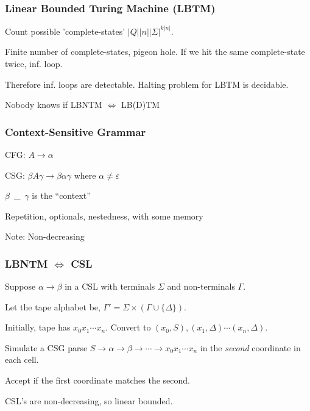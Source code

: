 \documentclass[languages_and_machines.tex]{subfiles}
\begin{document}
\begin{frame}
  \frametitle{Linear Bounded Turing Machine (LBTM)}

  Count possible 'complete-states' \(\lvert Q \rvert \lvert n \rvert \lvert \Sigma \rvert^{k \lvert n \rvert}\).

  \pause

  Finite number of complete-states, pigeon hole. If we hit the same complete-state twice, inf. loop.

  \pause

  Therefore inf. loops are detectable. Halting problem for LBTM is decidable.

  \pause

  Nobody knows if LBNTM \(\iff\) LB(D)TM

\end{frame}

\begin{frame}
  \frametitle{Context-Sensitive Grammar}

  CFG: \(A \to \alpha\)

  \pause

  CSG: \(\beta A \gamma \to \beta \alpha \gamma\) where \(\alpha \neq \varepsilon\)

  \pause

  \(\beta\)~\_~\(\gamma\) is the ``context''

  Repetition, optionals, nestedness\pause{}, with some memory

  \pause

  Note: Non-decreasing
\end{frame}

\begin{frame}
  \frametitle{LBNTM \(\iff\) CSL}

  Suppose \(\alpha \to \beta\) in a CSL with terminals \(\Sigma\) and non-terminals \(\Gamma\).

  \pause

  Let the tape alphabet be, \(\Gamma' = \Sigma \times (\Gamma \cup \{\Delta\})\).

  \pause

  Initially, tape has \(x_0 x_1 \dotsb x_n\). Convert to \((x_0, S), (x_1, \Delta) \dotsb (x_n, \Delta)\).

  \pause

  Simulate a CSG parse \(S \to \alpha \to \beta \to \dotsb \to x_0 x_1 \dotsb x_n\) in the \textit{second} coordinate in each cell.

  Accept if the first coordinate matches the second.

  \pause

  CSL's are non-decreasing, so linear bounded.

\end{frame}
\end{document}
